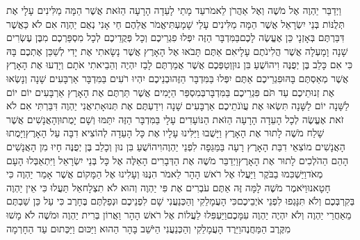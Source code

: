 \documentclass[../main/main.tex]{subfiles}
\begin{document}
\begin{multicols*}{\ncols}
וַיְדַבֵּר יַהְוֶה אֶל מֹשֶׁה וְאֶל אַהֲרֹן לֵאמֹר\PreVerseSpace{}עַד מָתַי לָעֵדָה הָרָעָה הַזֹּאת אֲשֶׁר הֵמָּה מַלִּינִים עָלָי אֶת תְּלֻנּוֹת בְּנֵי יִשְׂרָאֵל אֲשֶׁר הֵמָּה מַלִּינִים עָלַי שָׁמָעְתִּי\PreVerseSpace{}אֱמֹר אֲלֵהֶם חַי אָנִי נְאֻם יַהְוֶה אִם לֹא כַּאֲשֶׁר דִּבַּרְתֶּם בְּאָזְנָי כֵּן אֶעֱשֶׂה לָכֶם\PreVerseSpace{}בַּמִּדְבָּר הַזֶּה יִפְּלוּ פִגְרֵיכֶם וְכָל פְּקֻדֵיכֶם לְכָל מִסְפַּרְכֶם מִבֶּן עֶשְׂרִים שָׁנָה וָמָעְלָה אֲשֶׁר הֲלִינֹתֶם עָלָי\PreVerseSpace{}אִם אַתֶּם תָּבֹאוּ אֶל הָאָרֶץ אֲשֶׁר נָשָׂאתִי אֶת יָדִי לְשַׁכֵּן אֶתְכֶם בָּהּ כִּי אִם כָּלֵב בֶּן יְפֻנֶּה וִיהוֹשֻׁעַ בִּן נוּן\PreVerseSpace{}וְטַפְּכֶם אֲשֶׁר אֲמַרְתֶּם לָבַז יִהְיֶה וְהֵבֵיאתִי אֹתָם וְיָדְעוּ אֶת הָאָרֶץ אֲשֶׁר מְאַסְתֶּם בָּהּ\PreVerseSpace{}וּפִגְרֵיכֶם אַתֶּם יִפְּלוּ בַּמִּדְבָּר הַזֶּה\PreVerseSpace{}וּבְנֵיכֶם יִהְיוּ רֹעִים בַּמִּדְבָּר אַרְבָּעִים שָׁנָה וְנָשְׂאוּ אֶת זְנוּתֵיכֶם עַד תֹּם פִּגְרֵיכֶם בַּמִּדְבָּר\PreVerseSpace{}בְּמִסְפַּר הַיָּמִים אֲשֶׁר תַּרְתֶּם אֶת הָאָרֶץ אַרְבָּעִים יוֹם יוֹם לַשָּׁנָה יוֹם לַשָּׁנָה תִּשְׂאוּ אֶת עֲוֺנֹתֵיכֶם אַרְבָּעִים שָׁנָה וִידַעְתֶּם אֶת תְּנוּאָתִי\PreVerseSpace{}אֲנִי יַהְוֶה דִּבַּרְתִּי אִם לֹא זֹאת אֶעֱשֶׂה לְכָל הָעֵדָה הָרָעָה הַזֹּאת הַנּוֹעָדִים עָלָי בַּמִּדְבָּר הַזֶּה יִתַּמּוּ וְשָׁם יָמֻתוּ\PreVerseSpace{}וְהָאֲנָשִׁים אֲשֶׁר שָׁלַח מֹשֶׁה לָתוּר אֶת הָאָרֶץ וַיָּשֻׁבוּ וַיַּלִּינוּ\SubEnd{} עָלָיו אֶת כָּל הָעֵדָה לְהוֹצִיא דִבָּה עַל הָאָרֶץ\PreVerseSpace{}וַיָּמֻתוּ הָאֲנָשִׁים מוֹצִאֵי דִבַּת הָאָרֶץ רָעָה בַּמַּגֵּפָה לִפְנֵי יַהְוֶה\PreVerseSpace{}וִיהוֹשֻׁעַ בִּן נוּן וְכָלֵב בֶּן יְפֻנֶּה חָיוּ מִן הָאֲנָשִׁים הָהֵם הַהֹלְכִים לָתוּר אֶת הָאָרֶץ\PreVerseSpace{}וַיְדַבֵּר מֹשֶׁה אֶת הַדְּבָרִים הָאֵלֶּה אֶל כָּל בְּנֵי יִשְׂרָאֵל וַיִּתְאַבְּלוּ הָעָם מְאֹד\PreVerseSpace{}וַיַּשְׁכִּמוּ בַבֹּקֶר וַיַּעֲלוּ אֶל רֹאשׁ הָהָר לֵאמֹר הִנֶּנּוּ וְעָלִינוּ אֶל הַמָּקוֹם אֲשֶׁר אָמַר יַהְוֶה כִּי חָטָאנוּ\PreVerseSpace{}וַיֹּאמֶר מֹשֶׁה לָמָּה זֶּה אַתֶּם עֹבְרִים אֶת פִּי יַהְוֶה וְהוּא לֹא תִצְלָח\PreVerseSpace{}אַל תַּעֲלוּ כִּי אֵין יַהְוֶה בְּקִרְבְּכֶם וְלֹא תִּנָּגְפוּ לִפְנֵי אֹיְבֵיכֶם\PreVerseSpace{}כִּי הָעֲמָלֵקִי וְהַכְּנַעֲנִי שָׁם לִפְנֵיכֶם וּנְפַלְתֶּם בֶּחָרֶב כִּי עַל כֵּן שַׁבְתֶּם מֵאַחֲרֵי יַהְוֶה וְלֹא יִהְיֶה יַהְוֶה עִמָּכֶם\PreVerseSpace{}וַיַּעְפִּלוּ לַעֲלוֹת אֶל רֹאשׁ הָהָר וַאֲרוֹן בְּרִית יַהְוֶה וּמֹשֶׁה לֹא מָשׁוּ מִקֶּרֶב הַמַּחֲנֶה\PreVerseSpace{}וַיֵּרֶד הָעֲמָלֵקִי וְהַכְּנַעֲנִי הַיֹּשֵׁב בָּהָר הַהוּא וַיַּכּוּם וַיַּכְּתוּם עַד הַחָרְמָה\OpenSection{}\par

\end{multicols*}
\end{document}

